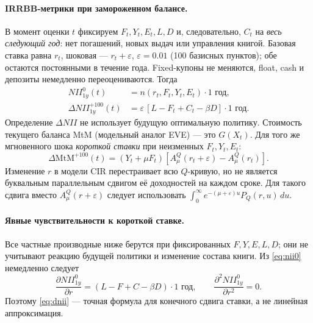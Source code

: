 \documentclass[11pt,a4paper]{article}
\begin{document}
\paragraph{IRRBB-метрики при замороженном балансе.}
В момент оценки $t$ фиксируем $F_t,Y_t,E_t,L,D$ и, следовательно,
$C_t$ на \emph{весь следующий год}: нет погашений, новых выдач или
управления книгой. Базовая ставка равна $r_t$, шоковая ---
$r_t+\varepsilon$, $\varepsilon=0.01$ (100 базисных пунктов); обе
остаются постоянными в течение года. Fixed-купоны не меняются, float,
cash и депозиты немедленно переоцениваются. Тогда
\begin{align}
 NII_{1y}^{0}(t)&=n(r_t,F_t,Y_t,E_t)\cdot1\text{ год},\label{eq:nii0}\\
 \Delta NII_{1y}^{+100}(t)
   &=\varepsilon\,[L-F_t+C_t-\beta D]\cdot1\text{ год}.\label{eq:dnii}
\end{align}
Определение $\Delta NII$ не использует будущую оптимальную политику.
Стоимость текущего баланса MtM (модельный аналог EVE) --- это $G(X_t)$.
Для того же мгновенного шока \emph{короткой ставки} при неизменных
$F_t,Y_t,E_t$:
\begin{equation}
 \Delta\mathrm{MtM}^{+100}(t)
 = (Y_t+\mu F_t)
 \left[A_\mu^Q(r_t+\varepsilon)-A_\mu^Q(r_t)\right].
 \label{eq:dmtm}
\end{equation}
Изменение $r$ в модели CIR перестраивает всю $Q$-кривую, но не является
буквальным параллельным сдвигом её доходностей на каждом сроке.
Для такого сдвига вместо $A_\mu^Q(r+\varepsilon)$ следует использовать
$\int_0^\infty e^{-(\mu+\varepsilon)u}P_Q(r,u)\,du$.

\paragraph{Явные чувствительности к короткой ставке.}
Все частные производные ниже берутся при фиксированных $F,Y,E,L,D$;
они не учитывают реакцию будущей политики и изменение состава книги.
Из \eqref{eq:nii0} немедленно следует
\begin{equation}
 \frac{\partial NII_{1y}^{0}}{\partial r}
 =(L-F+C-\beta D)\cdot1\text{ год},
 \qquad
 \frac{\partial^2 NII_{1y}^{0}}{\partial r^2}=0.
 \label{eq:nii-derivatives}
\end{equation}
Поэтому \eqref{eq:dnii} --- точная формула для конечного сдвига ставки,
а не линейная аппроксимация.
\end{document}
